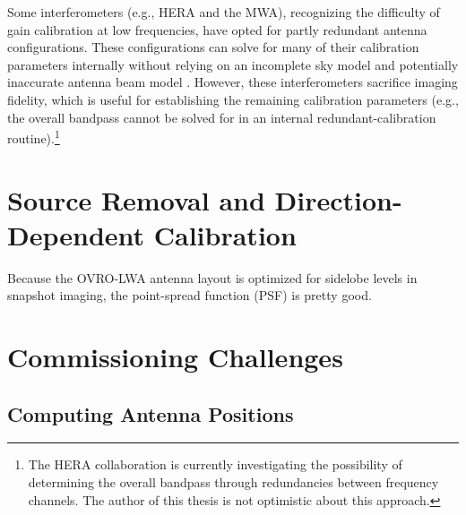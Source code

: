 \begin{bibunit}
Some interferometers (e.g., HERA and the MWA), recognizing the difficulty of gain calibration at low
frequencies, have opted for partly redundant antenna configurations. These configurations can solve
for many of their calibration parameters internally without relying on an incomplete sky model and
potentially inaccurate antenna beam model \citep{2010MNRAS.408.1029L}. However, these
interferometers sacrifice imaging fidelity, which is useful for establishing the remaining
calibration parameters (e.g., the overall bandpass cannot be solved for in an internal
redundant-calibration routine).\footnote{
    The HERA collaboration is currently investigating the possibility of determining the overall
    bandpass through redundancies between frequency channels. The author of this thesis is not
    optimistic about this approach.
}

\section{Source Removal and Direction-Dependent Calibration}

Because the OVRO-LWA antenna layout is optimized for sidelobe levels in snapshot imaging, the
point-spread function (PSF) is pretty good.

\section{Commissioning Challenges}

\subsection{Computing Antenna Positions}


\end{bibunit}
